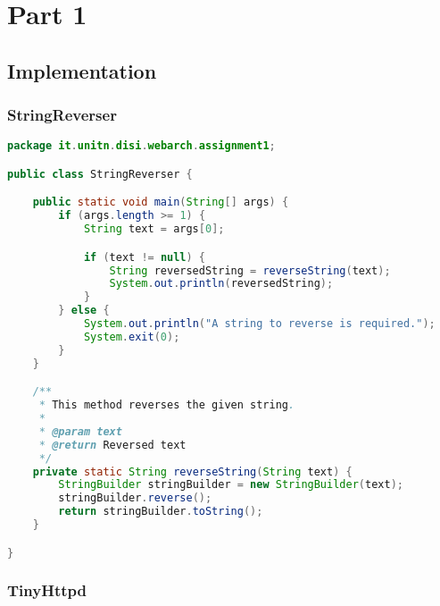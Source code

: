 \section{Part 1}

\subsection{Implementation}

\subsubsection{StringReverser}

\begin{lstlisting}[label=lst:01_part1_impl_stringreverser_code, caption=CLI command to start a GitLab runner in a Docker container, language=java, numbers=none]
package it.unitn.disi.webarch.assignment1;

public class StringReverser {

    public static void main(String[] args) {
        if (args.length >= 1) {
            String text = args[0];

            if (text != null) {
                String reversedString = reverseString(text);
                System.out.println(reversedString);
            }
        } else {
            System.out.println("A string to reverse is required.");
            System.exit(0);
        }
    }

    /**
     * This method reverses the given string.
     *
     * @param text
     * @return Reversed text
     */
    private static String reverseString(String text) {
        StringBuilder stringBuilder = new StringBuilder(text);
        stringBuilder.reverse();
        return stringBuilder.toString();
    }

}
\end{lstlisting}

\subsubsection{TinyHttpd}

